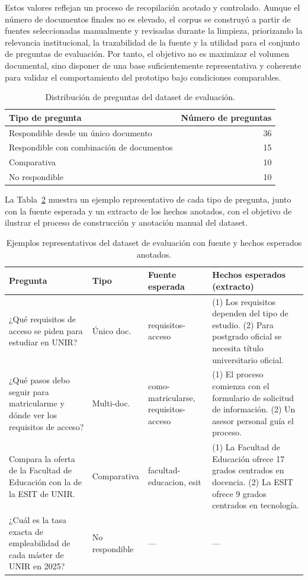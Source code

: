 Estos valores reflejan un proceso de recopilación acotado y controlado. 
Aunque el número de documentos finales no es elevado, el corpus se construyó a partir de fuentes seleccionadas manualmente y revisadas durante la limpieza, priorizando la relevancia institucional, la trazabilidad de la fuente y la utilidad para el conjunto de preguntas de evaluación. 
Por tanto, el objetivo no es maximizar el volumen documental, sino disponer de una base suficientemente representativa y coherente para validar el comportamiento del prototipo bajo condiciones comparables.

\begin{table}[H]
\centering
\begin{tabular}{lr}
\hline
\textbf{Tipo de pregunta} & \textbf{Número de preguntas} \\
\hline
Respondible desde un único documento & 36 \\
Respondible con combinación de documentos & 15 \\
Comparativa & 10 \\
No respondible & 10 \\
\hline
\end{tabular}
\caption{Distribución de preguntas del dataset de evaluación.}
\label{tab:distribucion_preguntas}
\end{table}

La Tabla~\ref{tab:ejemplos-dataset} muestra un ejemplo representativo de cada tipo de pregunta, junto con la fuente esperada y un extracto de los hechos anotados, con el objetivo de ilustrar el proceso de construcción y anotación manual del dataset.

\begin{table}[H]
\centering
\small
\begin{tabular}{p{4.0cm} p{1.8cm} p{2.6cm} p{4.6cm}}
\toprule
\textbf{Pregunta} & \textbf{Tipo} & \textbf{Fuente esperada} & \textbf{Hechos esperados (extracto)} \\
\midrule
¿Qué requisitos de acceso se piden para estudiar en UNIR? &
Único doc. &
requisitos-acceso &
(1) Los requisitos dependen del tipo de estudio. (2) Para postgrado oficial se necesita título universitario oficial. \\
\addlinespace
¿Qué pasos debo seguir para matricularme y dónde ver los requisitos de acceso? &
Multi-doc. &
como-matricularse, requisitos-acceso &
(1) El proceso comienza con el formulario de solicitud de información. (2) Un asesor personal guía el proceso. \\
\addlinespace
Compara la oferta de la Facultad de Educación con la de la ESIT de UNIR. &
Comparativa &
facultad-educacion, esit &
(1) La Facultad de Educación ofrece 17 grados centrados en docencia. (2) La ESIT ofrece 9 grados centrados en tecnología. \\
\addlinespace
¿Cuál es la tasa exacta de empleabilidad de cada máster de UNIR en 2025? &
No respondible &
--- &
--- \\
\bottomrule
\end{tabular}
\caption{Ejemplos representativos del dataset de evaluación con fuente y hechos esperados anotados.}
\label{tab:ejemplos-dataset}
\end{table}

